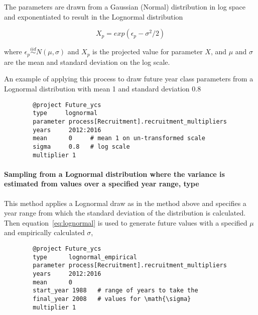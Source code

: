 The parameters are drawn from a Gaussian (Normal) distribution in log space and exponentiated  to result in the Lognormal distribution

\begin{equation}\label{eq:lognormal}
X_p = exp(\epsilon_p - \sigma^2 / 2)
\end{equation}

where $\epsilon_p\stackrel{iid}{\sim}N(\mu,\sigma)$ and $X_p$ is the projected value for parameter $X$, and $\mu$ and $\sigma$ are the mean and standard deviation on the log scale.

An example of applying this process to draw future year class parameters from a Lognormal distribution with mean 1 and standard deviation 0.8

{\small{\begin{verbatim}
		@project Future_ycs
		type     lognormal
		parameter process[Recruitment].recruitment_multipliers
		years     2012:2016
		mean      0     # mean 1 on un-transformed scale
		sigma     0.8   # log scale
		multiplier 1
		\end{verbatim}}}

\paragraph[Lognormal-Empirical]{Sampling from a Lognormal distribution where the  variance is estimated from values over a specified year range, type   }\label{sec:Project-LogNormalEmpirical} 

This method applies a Lognormal draw as in the  method above and specifies a year range from which the standard deviation of the distribution is calculated. Then equation~\eqref{eq:lognormal} is used to generate future values with a specified $\mu$ and empirically calculated $\sigma$,

{\small{\begin{verbatim}
		@project Future_ycs
		type      lognormal_empirical
		parameter process[Recruitment].recruitment_multipliers
		years     2012:2016
		mean      0
		start_year 1988   # range of years to take the
		final_year 2008   # values for \math{\sigma}
		multiplier 1
		\end{verbatim}}}


